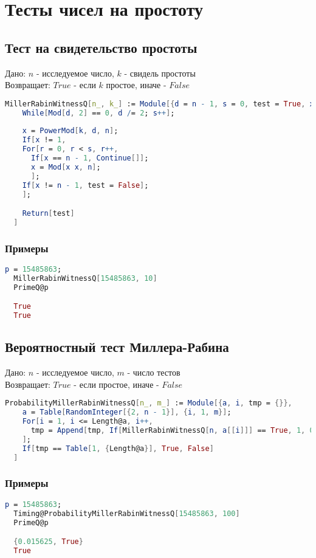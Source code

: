 
\chapter{Тесты чисел на простоту}

\section{Тест на свидетельство простоты}

  Дано: {$n$} - исследуемое число, {$k$} - свидель простоты \\
  Возвращает: {$True$} - если {$k$} простое, иначе - {$False$}

\begin{lstlisting}[language=Mathematica,caption={Тест Миллера-Рабина}]
  MillerRabinWitnessQ[n_, k_] := Module[{d = n - 1, s = 0, test = True, x, a, r},
    While[Mod[d, 2] == 0, d /= 2; s++];
    
    x = PowerMod[k, d, n];
    If[x != 1,
    For[r = 0, r < s, r++,
      If[x == n - 1, Continue[]];
      x = Mod[x x, n];
      ];
    If[x != n - 1, test = False];
    ];

    Return[test]
  ]
\end{lstlisting}

\subsection{Примеры}

  \begin{lstlisting}[language=Mathematica,caption={Пример 1}]
  p = 15485863;
  MillerRabinWitnessQ[15485863, 10]
  PrimeQ@p

  True
  True
  \end{lstlisting}

\section{Вероятностный тест Миллера-Рабина}

  Дано: {$n$} - исследуемое число, {$m$} - число тестов \\
  Возвращает: {$True$} - если простое, иначе - {$False$}

\begin{lstlisting}[language=Mathematica,caption={Вероятностный тест Миллера-Рабина}]
  ProbabilityMillerRabinWitnessQ[n_, m_] := Module[{a, i, tmp = {}},
    a = Table[RandomInteger[{2, n - 1}], {i, 1, m}];
    For[i = 1, i <= Length@a, i++,
      tmp = Append[tmp, If[MillerRabinWitnessQ[n, a[[i]]] == True, 1, 0]];
    ];
    If[tmp == Table[1, {Length@a}], True, False]
  ] 
\end{lstlisting}

\subsection{Примеры}

  \begin{lstlisting}[language=Mathematica,caption={Пример 1}]
  p = 15485863;
  Timing@ProbabilityMillerRabinWitnessQ[15485863, 100]
  PrimeQ@p

  {0.015625, True}
  True 
  \end{lstlisting}

  
